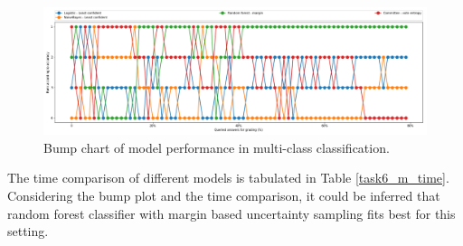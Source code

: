 	\begin{figure}[h]
		\centering
		\includegraphics[scale=0.3]{images/task6_rank}
		\caption{Bump chart of model performance in multi-class classification.}
		\label{t6_m_bump}
	\end{figure}
	
	The time comparison of different models is tabulated in Table \ref{task6_m_time}. Considering the bump plot and the time comparison, it could be inferred that random forest classifier with margin based uncertainty sampling fits best for this setting.
	
